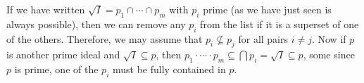 If we have written $\sqrt{I} = p_1\cap\cdots\cap p_m$ with $p_i$ prime
(as we have just seen is always possible), then we can remove any $p_i$ from the
list if it is a superset of one of the others. Therefore, we may assume
that $p_i \nsubseteq p_j$ for all pairs $i\neq j$. Now if $p$ is another prime
ideal and $\sqrt{I} \subseteq p$, then $p_1\cdot\cdots\cdot p_m \subseteq \bigcap p_i = \sqrt{I} \subseteq p$,
some since $p$ is prime, one of the $p_i$ must be fully contained in $p$.
